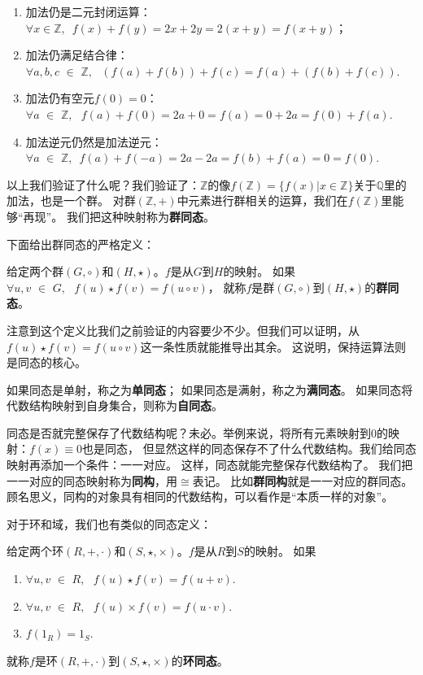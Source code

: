 \documentclass[12pt,UTF8,fontset=none]{ctexbook}
\begin{document}
\begin{appendix}
\begin{enumerate}
    \item 加法仍是二元封闭运算：$\forall x \in \mathbb{Z}, \,\,\, f(x) + f(y) = 2x + 2y = 2(x+y) = f(x+y)$；
    \item 加法仍满足结合律：$\forall a, b, c\,\, \in\,\, \mathbb{Z}, \,\,\,\, (f(a) +  f(b)) + f(c) = f(a) + (f(b)+ f(c)).$
    \item 加法仍有空元$f(0) = 0$：$\forall a \,\, \in \,\, \mathbb{Z}, \,\,\,\, f(a) + f(0) = 2a + 0 = f(a)  = 0 + 2a = f(0) + f(a). $
    \item 加法逆元仍然是加法逆元：$\forall a \,\, \in \,\, \mathbb{Z}, \,\,\, f(a) + f(-a) = 2a - 2a = f(b) + f(a) = 0 = f(0).$
\end{enumerate}

以上我们验证了什么呢？我们验证了：$\mathbb{Z}$的像$f(\mathbb{Z}) = \{f(x) | x \in \mathbb{Z}\}$关于$\mathbb{Q}$里的加法，也是一个群。
对群$\left(\mathbb{Z},+\right)$中元素进行群相关的运算，我们在$f(\mathbb{Z})$里能够“再现”。
我们把这种映射称为\textbf{群同态}。

下面给出群同态的严格定义：
\begin{df}\label{df:0_5}
    给定两个群$(G,\circ)$和$(H,\star)$。$f$是从$G$到$H$的映射。
    如果$\forall u, v \,\, \in \,\, G, \,\,\,\, f(u) \star f(v) = f(u\circ v)$，
    就称$f$是群$(G,\circ)$到$(H,\star)$的\textbf{群同态}。
\end{df}

注意到这个定义比我们之前验证的内容要少不少。但我们可以证明，从$ f(u) \star f(v) = f(u\circ v)$这一条性质就能推导出其余。
这说明，保持运算法则是同态的核心。

如果同态是单射，称之为\textbf{单同态}；
如果同态是满射，称之为\textbf{满同态}。
如果同态将代数结构映射到自身集合，则称为\textbf{自同态}。

同态是否就完整保存了代数结构呢？未必。举例来说，将所有元素映射到0的映射：$f(x) \equiv 0$也是同态，
但显然这样的同态保存不了什么代数结构。我们给同态映射再添加一个条件：一一对应。
这样，同态就能完整保存代数结构了。
我们把一一对应的同态映射称为\textbf{同构}，用$\cong$表记。
比如\textbf{群同构}就是一一对应的群同态。
顾名思义，同构的对象具有相同的代数结构，可以看作是“本质一样的对象”。

对于环和域，我们也有类似的同态定义：
\begin{df}\label{df:0_5_2}
    给定两个环$(R, +, \cdot )$和$(S, \star , \times)$。$f$是从$R$到$S$的映射。
    如果
    \begin{enumerate}
        \item $\forall u, v \,\, \in \,\, R, \,\,\,\, f(u) \star f(v) = f(u + v).$
        \item $\forall u, v \,\, \in \,\, R, \,\,\,\, f(u) \times f(v) = f(u \cdot v).$
        \item $f(1_R) = 1_S.$
    \end{enumerate}
    就称$f$是环$(R, +, \cdot )$到$(S, \star , \times)$的\textbf{环同态}。
\end{df}


\end{appendix}
\end{document}
